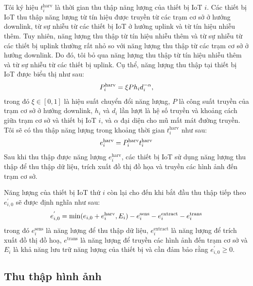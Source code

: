 \documentclass{article} %
\begin{document}
Tôi ký hiệu $t_i^{\mathrm{harv}}$ là thời gian thu thập năng lượng của thiết bị IoT $i$. Các thiết bị IoT thu thập năng lượng từ tín hiệu được truyền từ các trạm cơ sở ở hướng downlink, từ sự nhiễu từ các thiết bị IoT ở hướng uplink và từ tín hiệu nhiễu thêm. Tuy nhiên, năng lượng thu thập từ tín hiệu nhiễu thêm và từ sự nhiễu từ các thiết bị uplink thường rất nhỏ so với năng lượng thu thập từ các trạm cơ sở ở hướng downlink. Do đó, tôi bỏ qua năng lượng thu thập từ tín hiệu nhiễu thêm và từ sự nhiễu từ các thiết bị uplink. Cụ thể, năng lượng thu thập tại thiết bị IoT được biểu thị như sau:
\begin{equation}
P^{\rm{harv}}_i=\xi P  h_{i} d_{i}^{-\alpha},    
\end{equation}
trong đó $\xi\in\left[0,1\right]$ là hiệu suất chuyển đổi năng lượng, $P$ là công suất truyền của trạm cơ sở ở hướng downlink, $h_i$ và $d_i$ lần lượt là hệ số truyền và khoảng cách giữa trạm cơ sở và thiết bị IoT $i$, và $\alpha$ đại diện cho mũ mất mát đường truyền. Tôi sẽ có thu thập năng lượng trong khoảng thời gian $t_i^{\mathrm{harv}}$ như sau:
\begin{equation}
    e_i^{\rm{harv}} = P^{\rm{harv}}_i  t_i^{\rm{harv}}
\end{equation}
Sau khi thu thập được năng lượng $e_i^{\mathrm{harv}}$, các thiết bị IoT sử dụng năng lượng thu thập để thu thập dữ liệu, trích xuất đồ thị đồ họa và truyền các hình ảnh đến trạm cơ sở.

Năng lượng của thiết bị IoT thứ $i$ còn lại cho đến khi bắt đầu thu thập tiếp theo $e_{i,0}^\prime$ sẽ được định nghĩa như sau:
\begin{equation}
e^{'}_{i, 0} = \min(e_{i,0} + e_i^{\rm{harv}}, E_i) - e_i^{\rm{sens}} - e_i^{\rm{extract}} - e_i^{\rm{trans}}
\end{equation}
trong đó $e_i^{\mathrm{sens}}$ là năng lượng để thu thập dữ liệu, $e_i^{\mathrm{extract}}$ là năng lượng để trích xuất đồ thị đồ hoạ, $e^{\mathrm{trans}}$ là năng lượng để truyền các hình ảnh đến trạm cơ sở và $E_i$ là khả năng lưu trữ năng lượng của thiết bị và cần đảm bảo rằng $e_{i,0}^\prime\geq0$.

\subsection{Thu thập hình ảnh}
\end{document}
